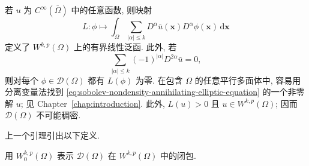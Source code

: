\begin{Proof}
若 $u$ 为 $C^{\infty}(\overline\Omega)$ 中的任意函数, 则映射
\begin{equation}\label{eq:sobolev-test-functions-annihilating-functional}
L:\phi\mapsto\int_{\Omega}\sum_{|\alpha|\leq k}D^\alpha\bar u(\bm{x})D^\alpha\phi(\bm{x})\,\mathrm{d}\bm{x}
\end{equation}
定义了 $W^{k,p}(\Omega)$ 上的有界线性泛函. 此外, 若
\begin{equation}\label{eq:sobolev-nondensity-annihilating-elliptic-equation}
\sum_{|\alpha|\leq k}(-1)^{|\alpha|}D^{2\alpha}\bar u=0,
\end{equation}
则对每个 $\phi\in\mathcal{D}(\Omega)$ 都有 $L(\phi)$ 为零. 在包含 $\Omega$ 的任意平行多面体中, 容易用分离变量法找到 \eqref{eq:sobolev-nondensity-annihilating-elliptic-equation} 的一个非零解 $u$; 见 Chapter~\ref{chap:introduction}. 此外, $L(u)>0$ 且 $u\in W^{k,p}(\Omega)$; 因而 $\mathcal{D}(\Omega)$ 不可能稠密.
\end{Proof}

上一个引理引出以下定义.

\begin{Definition}
\label{def:sobolev-test-function-closure}
用 $W_0^{k,p}(\Omega)$ 表示 $\mathcal{D}(\Omega)$ 在 $W^{k,p}(\Omega)$ 中的闭包.
\end{Definition}

